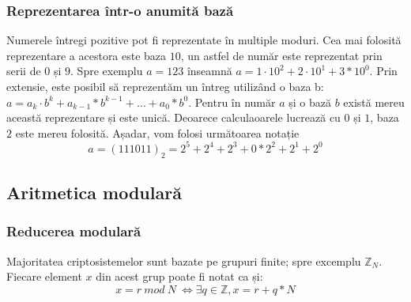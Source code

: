 \documentclass[12]{report}
\begin{document}
      \subsubsection{Reprezentarea într-o anumită bază}
      Numerele întregi pozitive pot fi reprezentate în multiple moduri. Cea mai folosită reprezentare a acestora este baza $10$, un astfel de număr este reprezentat prin serii de $0$ și $9$. Spre exemplu $ a = 123 $ înseamnă $ a = 1 \cdot   10^2 + 2 \cdot 10^1 + 3*10^0$. Prin extensie, este posibil să reprezentăm un întreg utilizând o baza b: $ a = a_k \cdot   b^k + a_{k-1}*b^{k-1} +  \dots  + a_0*b^0 $. Pentru în număr $a$ și o bază $b$ există mereu această reprezentare și este unică. Deoarece calculaoarele lucrează cu $0$ și $1$, baza $2$ este mereu folosită. Așadar, vom folosi următoarea notație \\
      $$ a=(111011)_2 = 2^5 + 2^4 + 2^3 + 0*2^2 + 2^1 + 2^0 $$
      \subsection{Aritmetica modulară}
       \subsubsection{Reducerea modulară}
        Majoritatea criptosistemelor sunt bazate pe grupuri finite; spre excemplu $ \mathbb{Z}_N $. Fiecare element $x$ din acest grup poate fi notat ca și: \\
        $$ x = r  \ mod \ N \ \Leftrightarrow \exists q \in \mathbb{Z} , x = r+q*N$$
\end{document}
